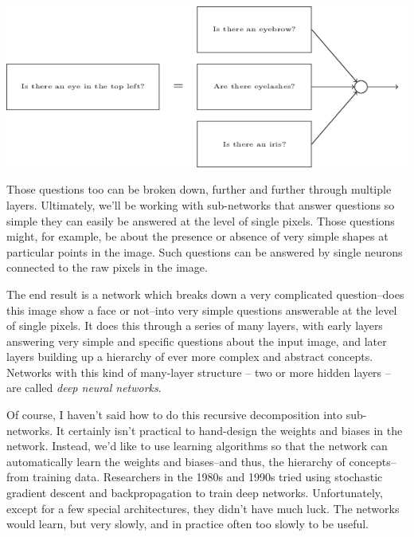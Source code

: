 \documentclass[a4paper,twoside,10pt]{book}
\begin{document}
\begin{center}
	\includegraphics[scale=0.5]{./figures/ch1/tikz15}
\end{center}
Those questions too can be broken down, further and further through multiple layers. Ultimately, we'll be working with sub-networks that answer questions so simple they can easily be answered at the level of single pixels. Those questions might, for example, be about the presence or absence of very simple shapes at particular points in the image. Such questions can be answered by single neurons connected to the raw pixels in the image.

The end result is a network which breaks down a very complicated question--does this image show a face or not--into very simple questions answerable at the level of single pixels. It does this through a series of many layers, with early layers answering very simple and specific questions about the input image, and later layers building up a hierarchy of ever more complex and abstract concepts. Networks with this kind of many-layer structure -- two or more hidden layers -- are called \textit{deep neural networks}.

Of course, I haven't said how to do this recursive decomposition into sub-networks. It certainly isn't practical to hand-design the weights and biases in the network. Instead, we'd like to use learning algorithms so that the network can automatically learn the weights and biases--and thus, the hierarchy of concepts--from training data. Researchers in the 1980s and 1990s tried using stochastic gradient descent and backpropagation to train deep networks. Unfortunately, except for a few special architectures, they didn't have much luck. The networks would learn, but very slowly, and in practice often too slowly to be useful.
\end{document}
